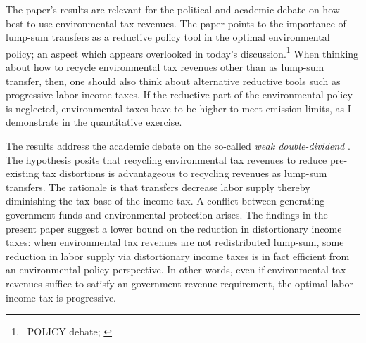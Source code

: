 The paper's results are relevant for the political and academic debate on how best to use environmental tax revenues. The paper points to the importance of lump-sum transfers as a reductive policy tool in the optimal environmental policy; an aspect which appears overlooked in today's discussion.\footnote{\ POLICY debate; \cite{Fried2018TheGenerations}}
When thinking about how to recycle environmental tax revenues other than as lump-sum transfer, then, one should also think about alternative reductive tools such as progressive labor income taxes. 
If the reductive part of the environmental policy is neglected, environmental taxes have to be higher to meet emission limits, as I demonstrate in the quantitative exercise.

The results address the academic debate on the so-called \textit{weak double-dividend} \citep[for example:][]{LansBovenberg1994EnvironmentalTaxation, LansBovenberg1996OptimalAnalyses}. The hypothesis posits that recycling environmental tax revenues to reduce pre-existing tax distortions is advantageous to recycling  revenues as lump-sum transfers. The rationale is that transfers decrease labor supply thereby diminishing the tax base of the income tax. A conflict between generating government funds and environmental protection arises. The findings in the present paper suggest a lower bound on the reduction in distortionary income taxes: when environmental tax revenues are not redistributed lump-sum, some reduction in labor supply via distortionary income taxes is in fact efficient from an environmental policy perspective. In other words, even if environmental tax revenues suffice to satisfy an government revenue requirement, the optimal labor income tax is progressive.  %

